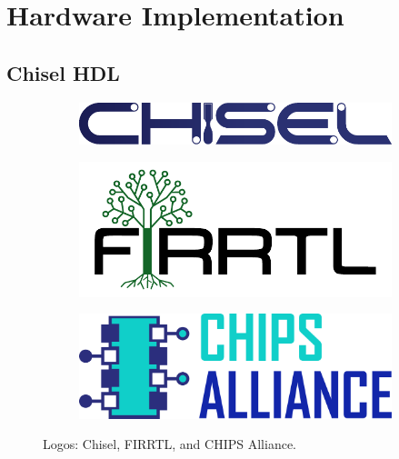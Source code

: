 \chapter{Hardware Implementation}
\label{Chapter2}


\section{Chisel HDL}
\label{sec:chisel_hdl}

\begin{figure}[htbp]
    \centering
    \begin{subfigure}[b]{0.3\textwidth}
        \centering
        \includegraphics[width=\linewidth]{Images/01_Chisel_chisel.pdf}
    \end{subfigure}%
    \hfill
    \begin{subfigure}[b]{0.2\textwidth}
        \centering
        \includegraphics[width=\linewidth]{Images/01_Chisel_firrtl.pdf}
    \end{subfigure}%
    \hfill
    \begin{subfigure}[b]{0.2\textwidth}
        \centering
        \includegraphics[width=\linewidth]{Images/01_Chisel_chips_alliance.pdf}
    \end{subfigure}
    \caption{Logos: Chisel, FIRRTL, and CHIPS Alliance.}
    \label{fig:chisel_ecosystem_logos}
\end{figure}

